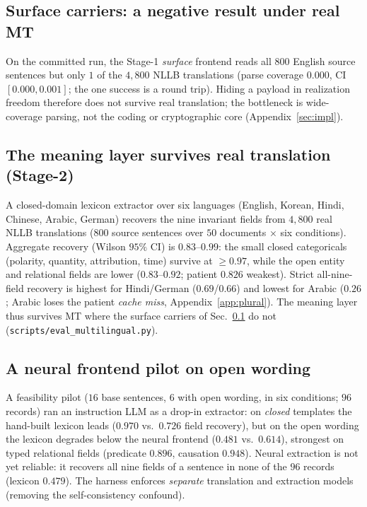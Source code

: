 \documentclass[journal]{IEEEtran}
\begin{document}
\subsection{Surface carriers: a negative result under real MT}
\label{sec:realmt}
On the committed run, the Stage-1 \emph{surface} frontend reads all $800$ English source sentences but only $1$ of the $4{,}800$ NLLB translations (parse coverage $0.000$, CI $[0.000,0.001]$; the one success is a round trip). Hiding a payload in realization freedom therefore does not survive real translation; the bottleneck is wide-coverage parsing, not the coding or cryptographic core (Appendix~\ref{sec:impl}).

\subsection{The meaning layer survives real translation (Stage-2)}
\label{sec:stage2}
A closed-domain lexicon extractor over six languages (English, Korean, Hindi, Chinese, Arabic, German) recovers the nine invariant fields from $4{,}800$ real NLLB translations ($800$ source sentences over $50$ documents $\times$ six conditions). Aggregate recovery (Wilson $95\%$ CI) is $0.83$--$0.99$: the small closed categoricals (polarity, quantity, attribution, time) survive at $\ge0.97$, while the open entity and relational fields are lower ($0.83$--$0.92$; patient $0.826$ weakest). Strict all-nine-field recovery is highest for Hindi/German ($0.69$/$0.66$) and lowest for Arabic ($0.26$; Arabic loses the patient \emph{cache miss}, Appendix~\ref{app:plural}). The meaning layer thus survives MT where the surface carriers of Sec.~\ref{sec:realmt} do not (\texttt{scripts/\allowbreak eval\_multilingual.py}).

\subsection{A neural frontend pilot on open wording}
\label{sec:neural}
A feasibility pilot ($16$ base sentences, $6$ with open wording, in six conditions; $96$ records) ran an instruction LLM as a drop-in extractor: on \emph{closed} templates the hand-built lexicon leads ($0.970$ vs.\ $0.726$ field recovery), but on the open wording the lexicon degrades below the neural frontend ($0.481$ vs.\ $0.614$), strongest on typed relational fields (predicate $0.896$, causation $0.948$). Neural extraction is not yet reliable: it recovers all nine fields of a sentence in none of the $96$ records (lexicon $0.479$). The harness enforces \emph{separate} translation and extraction models (removing the self-consistency confound).
\end{document}
